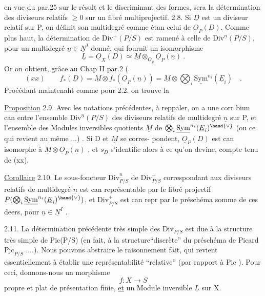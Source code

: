 
en vue du par.25 sur le résult et le discriminant des formes, sera la
détermination des diviseurs relatifs $\geqslant 0$ sur un fibré multiprojectif.
2.8.
Si $\underline{D}$ est un diviseur relatif sur P, on définit son multidegré comme étan
celui de $\underline{O}_P(D)$. Comme plus haut, la détermination de $\mathrm{Div}^{+}(P/S)$ est ramené
à celle de $\mathrm{Div}^{\underline{n}}(P/S)$, pour un multidegré $\underline{n}\in\underline{N}^{I}$ donné, qui fournit un
isomorphisme
\[ \underline{L} =\underline{O}_X(D) \simeq \underline{M} \otimes_{\underline{O}_S} \underline{O}_P(\underline{n}) \ . \]
Or on obtient, grâce au Chap II par.2 (
\[ (xx) \qquad f_*(\underline{D}) = \underline{M} \otimes f_*(\underline{O}_P(\underline{n})) = \underline{M} \otimes \bigotimes_i \underline{\mathrm{Sym}}^{n_i}(\underline{E}_i) \quad . \]
Proéédant maintenaht comme pour 2.2. on trouve la

\uline{Proposition} 2.9. Avec les notations précédentes, à reppaler, on a une
corr biun can entre l'ensemble $\mathrm{Div}^{\underline{n}}(P/S)$ des diviseurs relatifs de
multidegré $\underline{n}$ sur P, et l'ensemble des Modules inversibles quotients $\underline{M}$
de $\bigotimes_i \underline{\mathrm{Sym}}^{n_i}(\underline{E}_i)^{\hand{\vee}}$ (ou ce qui revient au même ...) . Si D et $\underline{M}$ se corres-%
pondent, $\underline{O}_P(D)$ est can isomorphe à $\underline{M}\otimes\underline{O}_P(\underline{n})$ , et $s_D$ s'identifie alors
à ce qu'on devine, compte tenu de (xx).

\uline{Corollaire} 2.10. Le sous-foncteur $\mathrm{Div}^{\underline{n}}_{P/S}$ de $\mathrm{Div}^{+}_{P/S}$ correspondant aux
diviseurs relatifs de multidegré $\underline{n}$ est can représentable par le fibré
projectif $P(\bigotimes_i \underline{\mathrm{Sym}}^{n_i}(\underline{E}_i)^{\hand{\vee}})$, et $\underline{\mathrm{Div}}^{+}_{P/S}$ est can repr par le préschéma
somme de ces deers, pour $\underline{n}\in\underline{N}^{I}$ .

2.11. La détermination précédente très simple des $\mathrm{Div}_{P/S}$ est due à la
structure très simple de Pic(P/S) (en fait, à la structure``discrète'' du
préschéma de Picard $\underline{\mathrm{Pic}}_{P/S}$ ....). Nous pouvons abstraire le raisonnement
fait, qui revient essentiellement à établir une représentabilité ``relative''
(par rapport à $\underline{\mathrm{Pic}}$ ). Pour ceci, donnons-nous un morphisme
\[ f\colon X \to S \]
propre et plat de présentation finie, \uline{et} un Module inversible $\underline{L}$ sur X.

